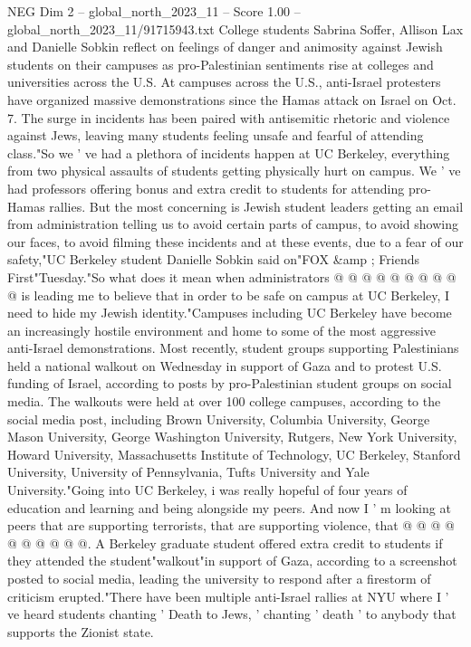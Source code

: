 \begin{textsample}{NEG Dim 2 – global\_north\_2023\_11 – Score 1.00 – global\_north\_2023\_11/91715943.txt}  \label{ex:f2_neg_136}
College students Sabrina Soffer, Allison Lax and Danielle Sobkin reflect on feelings of danger and animosity against Jewish students on their campuses as pro-Palestinian sentiments rise at colleges and universities across the U.S.
At campuses across the U.S., anti-Israel protesters have organized massive demonstrations since the Hamas attack on Israel on Oct. 7.
The surge in incidents has been paired with antisemitic rhetoric and violence against Jews, leaving many students feeling unsafe and fearful of attending class."So we ' ve had a plethora of incidents happen at UC Berkeley, everything from two physical assaults of students getting physically hurt on campus.
We ' ve had professors offering bonus and extra credit to students for attending pro-Hamas rallies.
But the most concerning is Jewish student leaders getting an email from administration telling us to avoid certain parts of campus, to avoid showing our faces, to avoid filming these incidents and at these events, due to a fear of our safety,"UC Berkeley student Danielle Sobkin said on"FOX \&amp ; Friends First"Tuesday."So what does it mean when administrators @ @ @ @ @ @ @ @ @ @ is leading me to believe that in order to be safe on campus at UC Berkeley, I need to hide my Jewish identity."Campuses including UC Berkeley have become an increasingly hostile environment and home to some of the most aggressive anti-Israel demonstrations.
Most recently, student groups supporting Palestinians held a national walkout on Wednesday in support of Gaza and to protest U.S. funding of Israel, according to posts by pro-Palestinian student groups on social media.
The walkouts were held at over 100 college campuses, according to the social media post, including Brown University, Columbia University, George Mason University, George Washington University, Rutgers, New York University, Howard University, Massachusetts Institute of Technology, UC Berkeley, Stanford University, University of Pennsylvania, Tufts University and Yale University."Going into UC Berkeley, i was really hopeful of four years of education and learning and being alongside my peers.
And now I ' m looking at peers that are supporting terrorists, that are supporting violence, that @ @ @ @ @ @ @ @ @ @.
A Berkeley graduate student offered extra credit to students if they attended the student"walkout"in support of Gaza, according to a screenshot posted to social media, leading the university to respond after a firestorm of criticism erupted."There have been multiple anti-Israel rallies at NYU where I ' ve heard students chanting ' Death to Jews, ' chanting ' death ' to anybody that supports the Zionist state.

\end{textsample}

